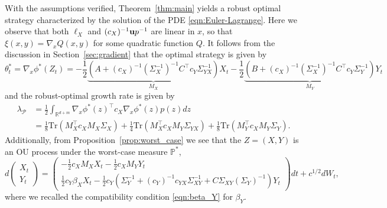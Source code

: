 \documentclass{article}
\theoremstyle{plain}
\theoremstyle{definition}
\newcommand{\R}{\mathbb{R}}
\renewcommand{\P}{\mathbb{P}}
\newcommand{\Pcal}{{\mathcal P}}
\numberwithin{lem}{section}
\begin{document}
With the assumptions verified, Theorem~\ref{thm:main} yields a robust optimal strategy characterized by the solution of the PDE \eqref{eqn:Euler-Lagrange}. Here we observe that both $\ell_X$ and $(c_X)^{-1} {\bf u} p^{-1}$ are linear in $x$, so that $\xi(x,y) = \nabla_x Q(x,y)$ for some quadratic function $Q$. It follows from the discussion in Section~\ref{sec:gradient} that the optimal strategy is given by
\[\theta^*_t = \nabla_x \phi^*(Z_t) =  -\frac{1}{2}\underbrace{(A+(c_X)^{-1}(\Sigma_X^{-1})^{-1}C^\top c_Y\Sigma^{-1}_{YX})}_{M_X}X_t -\frac{1}{2} \underbrace{(B + (c_X)^{-1}(\Sigma_X^{-1})^{-1}C^\top c_Y\Sigma_Y^{-1})}_{M_Y}Y_t\] 
and the robust-optimal growth rate is given by
\begin{align}
    \lambda_{\Pcal} & = \frac{1}{2}\int_{\R^{d+m}}\nabla_x \phi^*(z)^\top c_X\nabla_x \phi^*(z)p(z)dz \\
    & = \frac{1}{8}\mathrm{Tr}(M_X^\top c_X M_X\Sigma_X)+ \frac{1}{4}\mathrm{Tr}(M_X^\top c_XM_Y\Sigma_{YX}) + \frac{1}{8}\mathrm{Tr}(M_Y^\top c_XM_Y\Sigma_Y). \label{eqn:lambda_P_Gaussian}
\end{align} 
Additionally, from Proposition~\ref{prop:worst_case} we see that the $Z = (X,Y)$ is an OU process under the worst-case measure $\P^*$,
\[d\begin{pmatrix}
    X_t \\ Y_t 
\end{pmatrix} = \begin{pmatrix}
    -\frac{1}{2}c_XM_XX_t  -\frac{1}{2}c_XM_YY_t \\
    \frac{1}{2}c_Y\beta_X X_t - \frac{1}{2}c_Y(\Sigma^{-1}_Y + (c_Y)^{-1}c_{YX}\Sigma^{-1}_{XY} + C\Sigma_{XY}(\Sigma_Y)^{-1})Y_t
\end{pmatrix}dt + c^{1/2}dW_t,\]
where we recalled the compatibility condition \eqref{eqn:beta_Y} for $\beta_Y$.
\end{document}
